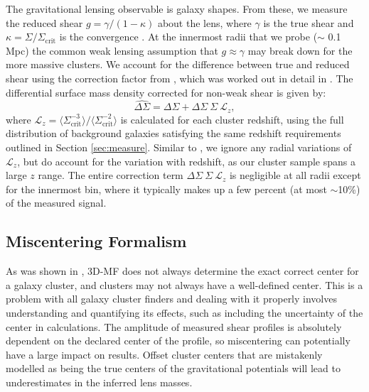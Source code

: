 The gravitational lensing observable is galaxy shapes. From these, we measure the reduced shear $g = \gamma / (1-\kappa)$ about the lens, where $\gamma$ is the true shear and $\kappa = \Sigma / \Sigma_{\mathrm{crit}}$ is the convergence \citep[as before, calculated using the \ac{NFW} halo formalism in][]{Wright00}. At the innermost radii that we probe ($\sim$ 0.1 \ac{Mpc}) the common weak lensing assumption that $g \approx \gamma$ may break down for the more massive clusters. We account for the difference between true and reduced shear using the correction factor from \citet{Johnston07}, which was worked out in detail in \citet{Mandelbaum06}. The differential surface mass density corrected for non-weak shear is given by:
\begin{equation}
\widehat{\Delta\Sigma} = \Delta\Sigma + \Delta\Sigma \ \Sigma \ \mathcal{L}_z,
\end{equation}
where $\mathcal{L}_z = \langle \Sigma_{\mathrm{crit}}^{-3} \rangle / \langle \Sigma_{\mathrm{crit}}^{-2} \rangle$ is calculated for each cluster redshift, using the full distribution of background galaxies satisfying the same redshift requirements outlined in Section \ref{sec:measure}. Similar to \citet{Leauthaud10}, we ignore any radial variations of $\mathcal{L}_z$, but do account for the variation with redshift, as our cluster sample spans a large $z$ range. The entire correction term $\Delta\Sigma \ \Sigma \ \mathcal{L}_z$ is negligible at all radii except for the innermost bin, where it typically makes up a few percent (at most $\sim$10\%) of the measured signal.


\subsection{Miscentering Formalism}
\label{sec:miscentering}

As was shown in \citet{Milkeraitis10}, \ac{3D-MF} does not always determine the exact correct center for a galaxy cluster, and clusters may not always have a well-defined center. This is a problem with all galaxy cluster finders and dealing with it properly involves understanding and quantifying its effects, such as including the uncertainty of the center in calculations. The amplitude of measured shear profiles is absolutely dependent on the declared center of the profile, so miscentering can potentially have a large impact on results. Offset cluster centers that are mistakenly modelled as being the true centers of the gravitational potentials will lead to underestimates in the inferred lens masses.

